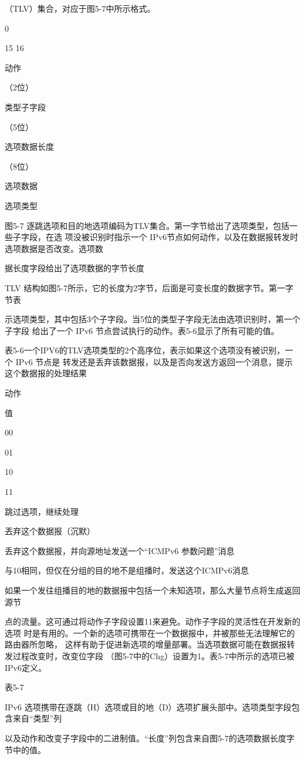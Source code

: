 （TLV）集合，对应于图5-7中所示格式。

0

15 16

动作

（2位）

类型子字段

（5位）

选项数据长度

（8位）

选项数据

选项类型

图5-7 逐跳选项和目的地选项编码为TLV集合。第一字节给出了选项类型，包括一些子字段，在选
项没被识别时指示一个 IPv6节点如何动作，以及在数据报转发时选项数据是否改变。选项数

据长度字段给出了选项数据的字节长度

TLV 结构如图5-7所示，它的长度为2字节，后面是可变长度的数据字节。第一字节表

示选项类型，其中包括3个子字段。当5位的类型子字段无法由选项识别时，第一个子字段
给出了一个 IPv6 节点尝试执行的动作。表5-6显示了所有可能的值。

表5-6一个IPV6的TLV选项类型的2个高序位，表示如果这个选项没有被识别，一个 IPv6 节点是
转发还是丢弃该数据报，以及是否向发送方返回一个消息，提示这个数据报的处理结果

动作

值

00

01

10

11

跳过选项，继续处理

丟弃这个数据报（沉默）

丢弃这个数据报，并向源地址发送一个“ICMPv6 参数问题”消息

与10相同，但仅在分组的目的地不是组播时，发送这个ICMPv6消息

如果一个发往组播目的地的数据报中包括一个未知选项，那么大量节点将生成返回源节

点的流量。这可通过将动作子字段设置11来避免。动作子字段的灵活性在开发新的选项
时是有用的。一个新的选项可携带在一个数据报中，并被那些无法理解它的路由器所忽略，
这样有助于促进新选项的增量部署。当选项数据可能在数据报转发过程改变时，改变位字段
（图5-7中的Chg）设置为1。表5-7中所示的选项已被IPv6定义。

表5-7

IPv6 选项携带在逐跳（H）选项或目的地（D）选项扩展头部中。选项类型字段包含来自“类型”列

以及动作和改变子字段中的二进制值。“长度”列包含来自图5-7的选项数据长度字节中的值。

